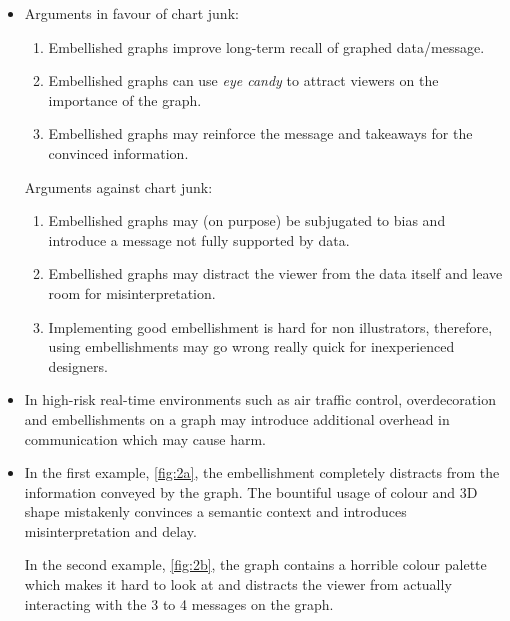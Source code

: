     \begin{exercise} \hfill
        \begin{itemize}
            \item[a)]
                Arguments in favour of chart junk:
                \begin{enumerate}
                    \item[I)] Embellished graphs improve long-term recall of graphed data/message.
                    \item[II)] Embellished graphs can use \emph{eye candy} to attract viewers on the importance of the graph. 
                    \item[III)] Embellished graphs may reinforce the message and takeaways for the convinced information.
                \end{enumerate}

                Arguments against chart junk:
                \begin{enumerate}
                    \item[I)] Embellished graphs may (on purpose) be subjugated to bias and introduce a message not fully supported by data.
                    \item[II)] Embellished graphs may distract the viewer from the data itself and leave room for misinterpretation.
                    \item[III)] Implementing good embellishment is hard for non illustrators, therefore, using embellishments may go wrong really quick for inexperienced designers.
                \end{enumerate}

            \item[b)] In high-risk real-time environments such as air traffic control, overdecoration and embellishments on a graph may introduce additional overhead in communication which may cause harm.

            \item[c)] In the first example, \autoref{fig:2a}, the embellishment completely distracts from the information conveyed by the graph.
            The bountiful usage of colour and 3D shape mistakenly convinces a semantic context and introduces misinterpretation and delay.

            In the second example, \autoref{fig:2b}, the graph contains a horrible colour palette which makes it hard to look at and distracts the viewer from actually interacting with the 3 to 4 messages on the graph.


\end{itemize}
\end{exercise}
